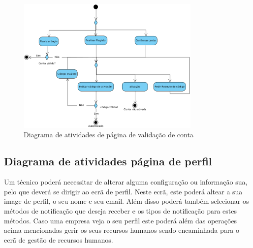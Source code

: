 \begin{figure}[htb]
    \centering
    \includegraphics[width=0.8\textwidth]{images/diagramas/atividades/diagrama_atividades_autenticação.png}
    \caption{Diagrama de atividades de página de validação de conta}
    \label{fig:26}
\end{figure}

\newpage




\subsection{Diagrama de atividades página de perfil}

Um técnico poderá necessitar de alterar alguma configuração ou informação sua, pelo que deverá se dirigir
ao ecrã de perfil. Neste ecrã, este poderá altear a sua image de perfil, o seu nome e seu email. 
Além disso poderá também selecionar os métodos de notificação que deseja receber e os tipos de notificação
para estes métodos. Caso uma empresa veja o seu perfil este poderá além das operações acima mencionadas
gerir os seus recursos humanos sendo encaminhada para o ecrã de gestão de recursos humanos.

